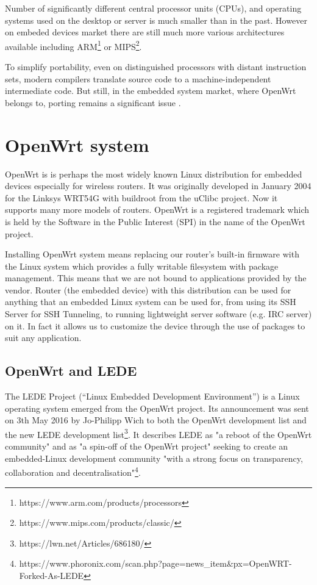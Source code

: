 Number of significantly different central processor units (CPUs), and operating systems used on the desktop or server is much smaller than in the past.
However on embeded devices market there are still much more various architectures available including ARM\footnote{https://www.arm.com/products/processors} or MIPS\footnote{https://www.mips.com/products/classic/}.

To simplify portability, even on distinguished processors with distant instruction sets, modern compilers translate source code to a machine-independent intermediate code.
But still, in the embedded system market, where OpenWrt belongs to, porting remains a significant issue \cite{porting_software}.



\section{OpenWrt system}\label{owrt}
OpenWrt is is perhaps the most widely known Linux distribution for embedded devices especially for wireless routers.
It was originally developed in January 2004 for the Linksys WRT54G with buildroot from the uClibc project.
Now it supports many more models of routers.
OpenWrt is a registered trademark which is held by the Software in the Public Interest (SPI) in the name of the OpenWrt project.

Installing OpenWrt system means replacing our router’s built-in firmware with the Linux system which provides a fully writable filesystem with package management.
This means that we are not bound to applications provided by the vendor.
Router (the embedded device) with this distribution can be used for anything that an embedded Linux system can be used for, from using its SSH Server for SSH Tunneling, to running lightweight server software (e.g. IRC server) on it.
In fact it allows us to customize the device through the use of packages to suit any application. \cite{openwrt}



\subsection{OpenWrt and LEDE}

The LEDE Project (“Linux Embedded Development Environment”) is a Linux operating system emerged from the OpenWrt project.
Its announcement was sent on 3th May 2016 by Jo-Philipp Wich to both the OpenWrt development list and the new LEDE development list\footnote{https://lwn.net/Articles/686180/}.
It describes LEDE as "a reboot of the OpenWrt community" and as "a spin-off of the OpenWrt project" seeking to create an embedded-Linux development community "with a strong focus on transparency, collaboration and decentralisation"\footnote{https://www.phoronix.com/scan.php?page=news\_item\&px=OpenWRT-Forked-As-LEDE}.

